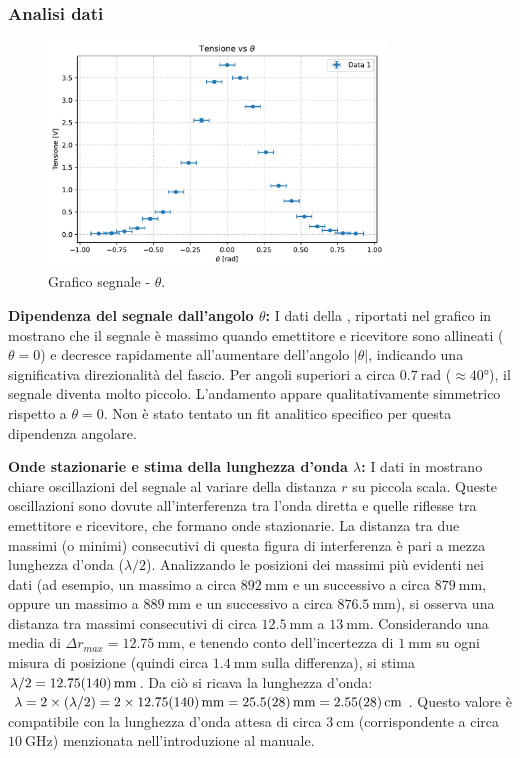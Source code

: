 \documentclass[a4paper]{article}
\begin{document}
\subsubsection{Analisi dati}
\begin{figure}[htbp]
	\centering
	\includegraphics[width=0.8\textwidth]{grafici/theta_qualitativo.pdf}
	\caption{Grafico segnale - $\theta$.}
	\label{fig:theta_qualitativo}
\end{figure}
\textbf{Dipendenza del segnale dall'angolo $\theta$:}
I dati della , riportati nel grafico in  mostrano che il segnale è massimo quando emettitore e ricevitore sono allineati ($\theta=0$) e decresce rapidamente all'aumentare dell'angolo $|\theta|$, indicando una significativa direzionalità del fascio. Per angoli superiori a circa $\SI{0.7}{\radian}$ ($\approx \ang{40}$), il segnale diventa molto piccolo. L'andamento appare qualitativamente simmetrico rispetto a $\theta=0$. Non è stato tentato un fit analitico specifico per questa dipendenza angolare.

\textbf{Onde stazionarie e stima della lunghezza d'onda $\lambda$:}
I dati in  mostrano chiare oscillazioni del segnale al variare della distanza $r$ su piccola scala. Queste oscillazioni sono dovute all'interferenza tra l'onda diretta e quelle riflesse tra emettitore e ricevitore, che formano onde stazionarie. La distanza tra due massimi (o minimi) consecutivi di questa figura di interferenza è pari a mezza lunghezza d'onda ($\lambda/2$).
Analizzando le posizioni dei massimi più evidenti nei dati (ad esempio, un massimo a circa $\SI{892}{\milli\metre}$ e un successivo a circa $\SI{879}{\milli\metre}$, oppure un massimo a $\SI{889}{\milli\metre}$ e un successivo a circa $\SI{876.5}{\milli\metre}$), si osserva una distanza tra massimi consecutivi di circa $\SI{12.5}{\milli\metre}$ a $\SI{13}{\milli\metre}$. Considerando una media di $\Delta r_{max} = \SI{12.75}{\milli\metre}$, e tenendo conto dell'incertezza di $\SI{1}{\milli\metre}$ su ogni misura di posizione (quindi circa $\SI{1.4}{\milli\metre}$ sulla differenza), si stima $\lambda/2 = \SI{12.75 \pm 1.4}{\milli\metre}$.
Da ciò si ricava la lunghezza d'onda:
$\lambda = 2 \times (\lambda/2) = 2 \times \SI{12.75 \pm 1.4}{\milli\metre} = \SI{25.5 \pm 2.8}{\milli\metre} = \SI{2.55 \pm 0.28}{\centi\metre}$.
Questo valore è compatibile con la lunghezza d'onda attesa di circa $\SI{3}{\centi\metre}$ (corrispondente a circa $\SI{10}{\giga\hertz}$) menzionata nell'introduzione al manuale.
\end{document}

